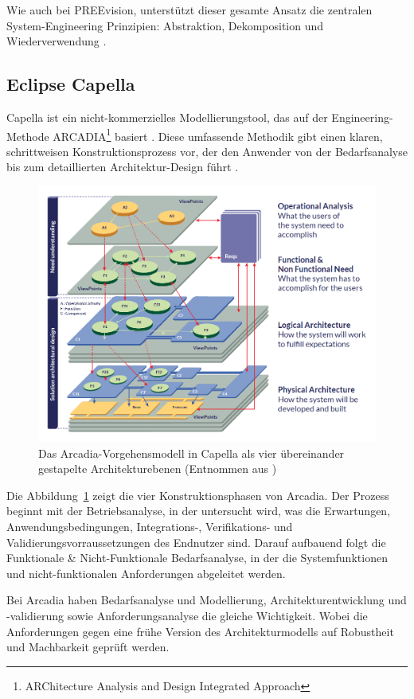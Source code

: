 Wie auch bei PREEvision, unterstützt dieser gesamte Ansatz die zentralen System-Engineering Prinzipien: Abstraktion, Dekomposition und Wiederverwendung \cite{The24}.

\subsection{Eclipse Capella}
Capella ist ein nicht-kommerzielles Modellierungstool, das auf der Engineering-Methode ARCADIA\footnote{ARChitecture Analysis and Design Integrated Approach} basiert \cite{roques2016mbse}. Diese umfassende Methodik gibt einen klaren, schrittweisen Konstruktionsprozess vor, der den Anwender von der Bedarfsanalyse bis zum detaillierten Architektur-Design führt \cite{let24}.

\begin{figure}[h!]
  \centering
  \includegraphics[width=.7\textwidth]{figures/03StandDerTechnik/phases_arcadia.png}
  \caption{Das Arcadia-Vorgehensmodell in Capella als vier übereinander gestapelte Architekturebenen (Entnommen aus \cite{let24})}
  \label{fig:capella_modell}
\end{figure}

Die Abbildung~\ref{fig:capella_modell} zeigt die vier Konstruktionsphasen von Arcadia. Der Prozess beginnt mit der Betriebsanalyse, in der untersucht wird, was die Erwartungen, Anwendungsbedingungen, Integrations-, Verifikations- und Validierungsvorraussetzungen des Endnutzer sind. Darauf aufbauend folgt die Funktionale \& Nicht-Funktionale Bedarfsanalyse, in der die Systemfunktionen und nicht-funktionalen Anforderungen abgeleitet werden.

Bei Arcadia haben Bedarfsanalyse und Modellierung, Architekturentwicklung und -validierung sowie Anforderungsanalyse die gleiche Wichtigkeit. Wobei die Anforderungen gegen eine frühe Version des Architekturmodells auf Robustheit und Machbarkeit geprüft werden.

